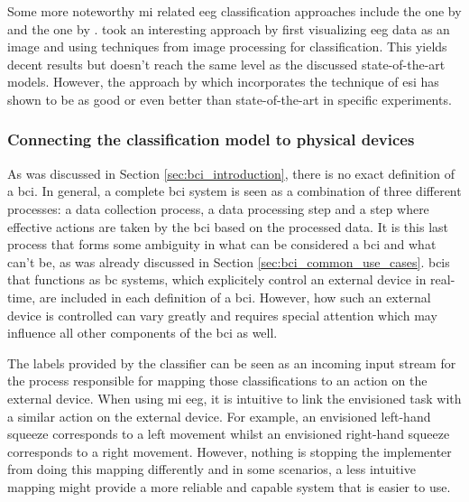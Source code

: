 Some more noteworthy \gls{mi} related \gls{eeg} classification approaches include the one by \citet{eeg_mi_model_image_based} and the one by \citet{eeg_model_esi}.
 took an interesting approach by first visualizing \gls{eeg} data as an image and using techniques from image processing for classification.
This yields decent results but doesn't reach the same level as the discussed state-of-the-art models.
However, the approach by \citet{eeg_model_esi} which incorporates the technique of \gls{esi} has shown to be as good or even better than state-of-the-art in specific experiments.




\subsubsection{Connecting the classification model to physical devices}
\label{subsubsec:bci_opportunities_obstacles_motivating_examples_physical_devices}

As was discussed in Section \ref{sec:bci_introduction}, there is no exact definition of a \gls{bci}.
In general, a complete \gls{bci} system is seen as a combination of three different processes: a data collection process, a data processing step and a step where effective actions are taken by the \gls{bci} based on the processed data.
It is this last process that forms some ambiguity in what can be considered a \gls{bci} and what can't be, as was already discussed in Section \ref{sec:bci_common_use_cases}.
\Glspl{bci} that functions as \gls{bc} systems, which explicitely control an external device in real-time, are included in each definition of a \gls{bci}.
However, how such an external device is controlled can vary greatly and requires special attention which may influence all other components of the \gls{bci} as well. 

The labels provided by the classifier can be seen as an incoming input stream for the process responsible for mapping those classifications to an action on the external device.
When using \gls{mi} \gls{eeg}, it is intuitive to link the envisioned task with a similar action on the external device.
For example, an envisioned left-hand squeeze corresponds to a left movement whilst an envisioned right-hand squeeze corresponds to a right movement.
However, nothing is stopping the implementer from doing this mapping differently and in some scenarios, a less intuitive mapping might provide a more reliable and capable system that is easier to use.

